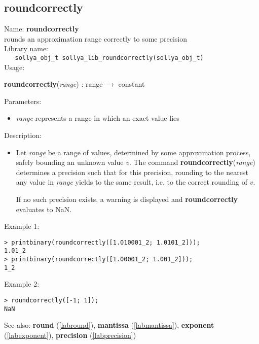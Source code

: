 \subsection{roundcorrectly}
\label{labroundcorrectly}
\noindent Name: \textbf{roundcorrectly}\\
\phantom{aaa}rounds an approximation range correctly to some precision\\[0.2cm]
\noindent Library name:\\
\verb|   sollya_obj_t sollya_lib_roundcorrectly(sollya_obj_t)|\\[0.2cm]
\noindent Usage: 
\begin{center}
\textbf{roundcorrectly}(\emph{range}) : \textsf{range} $\rightarrow$ \textsf{constant}\\
\end{center}
Parameters: 
\begin{itemize}
\item \emph{range} represents a range in which an exact value lies
\end{itemize}
\noindent Description: \begin{itemize}

\item Let \emph{range} be a range of values, determined by some approximation
   process, safely bounding an unknown value $v$. The command
   \textbf{roundcorrectly}(\emph{range}) determines a precision such that for this precision,
   rounding to the nearest any value in \emph{range} yields to the same
   result, i.e. to the correct rounding of $v$.
    
   If no such precision exists, a warning is displayed and \textbf{roundcorrectly}
   evaluates to NaN.
\end{itemize}
\noindent Example 1: 
\begin{center}\begin{minipage}{15cm}\begin{Verbatim}[frame=single,commandchars=\\\|\~]
> printbinary(roundcorrectly([1.010001_2; 1.0101_2]));
1.01_2
> printbinary(roundcorrectly([1.00001_2; 1.001_2]));
1_2
\end{Verbatim}
\end{minipage}\end{center}
\noindent Example 2: 
\begin{center}\begin{minipage}{15cm}\begin{Verbatim}[frame=single,commandchars=\\\|\~]
> roundcorrectly([-1; 1]);
NaN
\end{Verbatim}
\end{minipage}\end{center}
See also: \textbf{round} (\ref{labround}), \textbf{mantissa} (\ref{labmantissa}), \textbf{exponent} (\ref{labexponent}), \textbf{precision} (\ref{labprecision})
